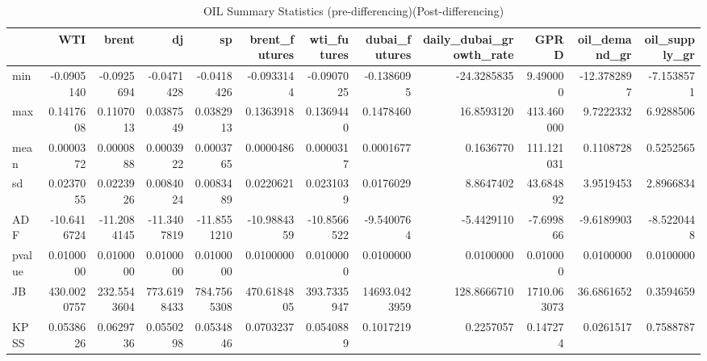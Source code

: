 \begin{table}
\centering
\caption{OIL Summary Statistics (pre-differencing)(Post-differencing)}
\centering
\begin{tabular}[t]{l|r|r|r|r|r|r|r|r|r|r|r}
\hline
  & WTI & brent & dj & sp & brent\_futures & wti\_futures & dubai\_futures & daily\_dubai\_growth\_rate & GPRD & oil\_demand\_gr & oil\_supply\_gr\\
\hline
min & -0.0905140 & -0.0925694 & -0.0471428 & -0.0418426 & -0.0933144 & -0.0907025 & -0.1386095 & -24.3285835 & 9.490000 & -12.3782897 & -7.1538571\\
\hline
max & 0.1417608 & 0.1107013 & 0.0387549 & 0.0382913 & 0.1363918 & 0.1369440 & 0.1478460 & 16.8593120 & 413.460000 & 9.7222332 & 6.9288506\\
\hline
mean & 0.0000372 & 0.0000888 & 0.0003922 & 0.0003765 & 0.0000486 & 0.0000317 & 0.0001677 & 0.1636770 & 111.121031 & 0.1108728 & 0.5252565\\
\hline
sd & 0.0237055 & 0.0223926 & 0.0084024 & 0.0083489 & 0.0220621 & 0.0231039 & 0.0176029 & 8.8647402 & 43.684892 & 3.9519453 & 2.8966834\\
\hline
ADF & -10.6416724 & -11.2084145 & -11.3407819 & -11.8551210 & -10.9884359 & -10.8566522 & -9.5400764 & -5.4429110 & -7.699866 & -9.6189903 & -8.5220448\\
\hline
pvalue & 0.0100000 & 0.0100000 & 0.0100000 & 0.0100000 & 0.0100000 & 0.0100000 & 0.0100000 & 0.0100000 & 0.010000 & 0.0100000 & 0.0100000\\
\hline
JB & 430.0020757 & 232.5543604 & 773.6198433 & 784.7565308 & 470.6184805 & 393.7335947 & 14693.0423959 & 128.8666710 & 1710.063073 & 36.6861652 & 0.3594659\\
\hline
KPSS & 0.0538626 & 0.0629736 & 0.0550298 & 0.0534846 & 0.0703237 & 0.0540889 & 0.1017219 & 0.2257057 & 0.147274 & 0.0261517 & 0.7588787\\
\hline
\end{tabular}
\end{table}
